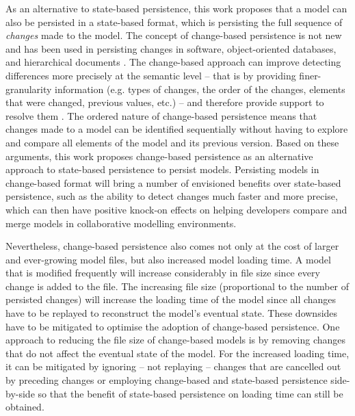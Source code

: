 \documentclass[12pt, a4paper]{report} \usepackage[titletoc]{appendix}
\begin{document}
As an alternative to state-based persistence, this work proposes that a model can also be persisted in a state-based format, which is persisting the full sequence of \emph{changes} made to the model. The concept of change-based persistence is not new and has been used in persisting changes in software, object-oriented databases, and hierarchical documents \cite{DBLP:journals/entcs/RobbesL07,DBLP:conf/sde/LippeO92,DBLP:conf/caise/IgnatN05}. The change-based approach can improve detecting differences more precisely at the semantic level -- that is by providing finer-granularity information (e.g. types of changes, the order of the changes, elements that were changed, previous values, etc.) -- and therefore provide support to resolve them \cite{mens2002state}. The ordered nature of change-based persistence means that changes made to a model can be identified sequentially without having to explore and compare all elements of the model and its previous version. Based on these arguments, this work proposes change-based persistence as an alternative approach to state-based persistence to persist models. Persisting models in change-based format will bring a number of envisioned benefits over state-based persistence, such as the ability to detect changes much faster and more precise, which can then have positive knock-on effects on helping developers compare and merge models in collaborative modelling environments. 

Nevertheless, change-based persistence also comes not only at the cost of larger and ever-growing model files, but also increased model loading time. A model that is modified frequently will increase considerably in file size since every change is added to the file. The increasing file size (proportional to the number of persisted changes) will increase the loading time of the model since all changes have to be replayed to reconstruct the model's eventual state. These downsides have to be mitigated to optimise the adoption of change-based persistence. One approach to reducing the file size of change-based models is by removing changes that do not affect the eventual state of the model. For the increased loading time, it can be mitigated by ignoring -- not replaying -- changes that are cancelled out by preceding changes or employing change-based and state-based persistence side-by-side so that the benefit of state-based persistence on loading time can still be obtained.   
\end{document}
